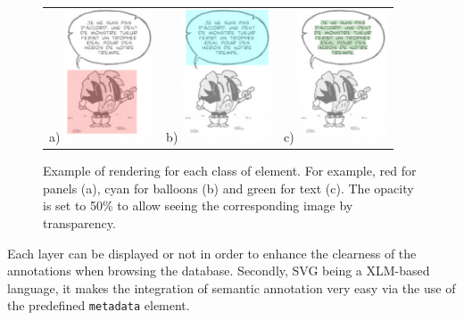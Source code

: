 \begin{figure}[h!]
\begin{center}
\begin{tabular}{ccc}
a) \includegraphics[width=100px]{svgPanel.png} 
& 
b) \includegraphics[width=100px]{svgBalloon.png}
&
c) \includegraphics[width=100px]{svgTextlines.png}
\end{tabular}
\caption[Annotation rendering in a browser]{Example of rendering for each class of element. For example, red for panels (a), cyan for balloons (b) and green for text (c). The opacity is set to 50\% to allow seeing the corresponding image by transparency.} 
\label{fig:gt:svgImage}
\end{center}
\end{figure}

Each layer can be displayed or not in order to enhance the clearness of the annotations when browsing the database.
Secondly, SVG being a XLM-based language, it makes the integration of semantic annotation very easy via the use of the predefined \texttt{metadata} element.

